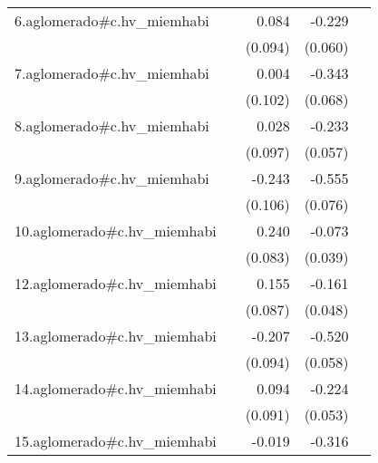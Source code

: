 {\begin{longtable}{l*{4}{D{.}{.}{-1}}}
\addlinespace
6.aglomerado#c.hv\_miemhabi&                     &       0.084         &      -0.229\sym{***}&                     \\
            &                     &     (0.094)         &     (0.060)         &                     \\
\addlinespace
7.aglomerado#c.hv\_miemhabi&                     &       0.004         &      -0.343\sym{***}&                     \\
            &                     &     (0.102)         &     (0.068)         &                     \\
\addlinespace
8.aglomerado#c.hv\_miemhabi&                     &       0.028         &      -0.233\sym{***}&                     \\
            &                     &     (0.097)         &     (0.057)         &                     \\
\addlinespace
9.aglomerado#c.hv\_miemhabi&                     &      -0.243\sym{*}  &      -0.555\sym{***}&                     \\
            &                     &     (0.106)         &     (0.076)         &                     \\
\addlinespace
10.aglomerado#c.hv\_miemhabi&                     &       0.240\sym{**} &      -0.073         &                     \\
            &                     &     (0.083)         &     (0.039)         &                     \\
\addlinespace
12.aglomerado#c.hv\_miemhabi&                     &       0.155         &      -0.161\sym{***}&                     \\
            &                     &     (0.087)         &     (0.048)         &                     \\
\addlinespace
13.aglomerado#c.hv\_miemhabi&                     &      -0.207\sym{*}  &      -0.520\sym{***}&                     \\
            &                     &     (0.094)         &     (0.058)         &                     \\
\addlinespace
14.aglomerado#c.hv\_miemhabi&                     &       0.094         &      -0.224\sym{***}&                     \\
            &                     &     (0.091)         &     (0.053)         &                     \\
\addlinespace
15.aglomerado#c.hv\_miemhabi&                     &      -0.019         &      -0.316\sym{***}&                     \\

\end{longtable}}

